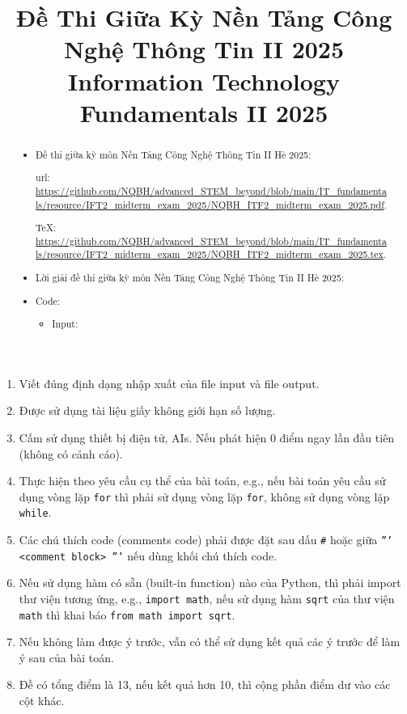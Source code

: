 \documentclass{article}
\title{Đề Thi Giữa Kỳ Nền Tảng Công Nghệ Thông Tin II 2025\\
	Information Technology Fundamentals II 2025}
\date{}
\begin{document}
\maketitle
\begin{abstract}
    \begin{itemize}
        \item Đề thi giữa kỳ môn Nền Tảng Công Nghệ Thông Tin II Hè 2025:
        
        {\sc url}: \url{https://github.com/NQBH/advanced_STEM_beyond/blob/main/IT_fundamentals/resource/IFT2_midterm_exam_2025/NQBH_ITF2_midterm_exam_2025.pdf}.
        
        \TeX: \url{https://github.com/NQBH/advanced_STEM_beyond/blob/main/IT_fundamentals/resource/IFT2_midterm_exam_2025/NQBH_ITF2_midterm_exam_2025.tex}.
        
        \item Lời giải đề thi giữa kỳ môn Nền Tảng Công Nghệ Thông Tin II Hè 2025:
        
        \item Code:
        \begin{itemize}
            \item Input: 
        \end{itemize}
    \end{itemize}
\end{abstract}
\begin{enumerate}
	\item Viết đúng định dạng nhập xuất của file input và file output.
	\item Được sử dụng tài liệu giấy không giới hạn số lượng.
	\item Cấm sử dụng thiết bị điện tử, AIs. Nếu phát hiện 0 điểm ngay lần đầu tiên (không có cảnh cáo).
	\item Thực hiện theo yêu cầu cụ thể của bài toán, e.g., nếu bài toán yêu cầu sử dụng vòng lặp {\tt for} thì phải sử dụng vòng lặp {\tt for}, không sử dụng vòng lặp {\tt while}.
	\item Các chú thích code (comments code) phải được đặt sau dấu {\tt\#} hoặc giữa {\tt''' <comment block> '''} nếu dùng khối chú thích code.
	\item Nếu sử dụng hàm có sẵn (built-in function) nào của Python, thì phải import thư viện tương ứng, e.g., {\tt import math}, nếu sử dụng hàm {\tt sqrt} của thư viện {\tt math} thì khai báo {\tt from math import sqrt}.
	\item Nếu không làm được ý trước, vẫn có thể sử dụng kết quả các ý trước để làm ý sau của bài toán.
	\item Đề có tổng điểm là 13, nếu kết quả hơn 10, thì cộng phần điểm dư vào các cột khác.
\end{enumerate}
\end{document}
